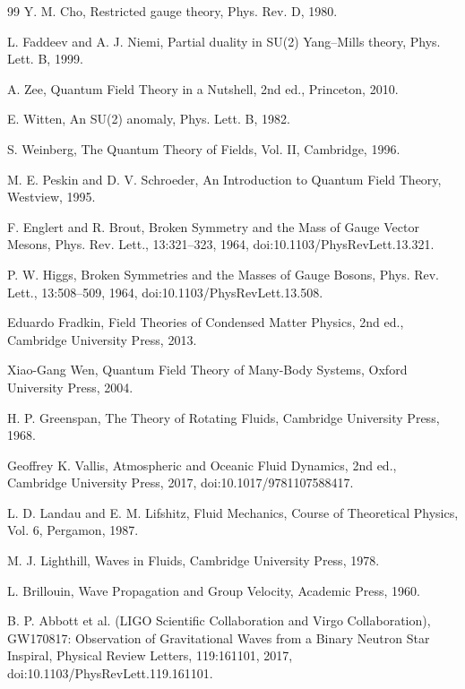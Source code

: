 \documentclass[10pt,reprint,aps,onecolumn,nofootinbib]{revtex4-2}
\begin{document}
\begin{thebibliography}{99}
     Y. M. Cho, Restricted gauge theory, Phys. Rev. D, 1980.

     L. Faddeev and A. J. Niemi, Partial duality in SU(2) Yang–Mills theory, Phys. Lett. B, 1999.

     A. Zee, Quantum Field Theory in a Nutshell, 2nd ed., Princeton, 2010.

     E. Witten, An SU(2) anomaly, Phys. Lett. B, 1982.

     S. Weinberg, The Quantum Theory of Fields, Vol. II, Cambridge, 1996.

     M. E. Peskin and D. V. Schroeder, An Introduction to Quantum Field Theory, Westview, 1995.

     F. Englert and R. Brout, Broken Symmetry and the Mass of Gauge Vector Mesons, Phys. Rev. Lett., 13:321--323, 1964, doi:10.1103/PhysRevLett.13.321.

     P. W. Higgs, Broken Symmetries and the Masses of Gauge Bosons, Phys. Rev. Lett., 13:508--509, 1964, doi:10.1103/PhysRevLett.13.508.

     Eduardo Fradkin, Field Theories of Condensed Matter Physics, 2nd ed., Cambridge University Press, 2013.

     Xiao-Gang Wen, Quantum Field Theory of Many-Body Systems, Oxford University Press, 2004.

     H. P. Greenspan, The Theory of Rotating Fluids, Cambridge University Press, 1968.

     Geoffrey K. Vallis, Atmospheric and Oceanic Fluid Dynamics, 2nd ed., Cambridge University Press, 2017, doi:10.1017/9781107588417.

     L. D. Landau and E. M. Lifshitz, Fluid Mechanics, Course of Theoretical Physics, Vol. 6, Pergamon, 1987.

     M. J. Lighthill, Waves in Fluids, Cambridge University Press, 1978.

     L. Brillouin, Wave Propagation and Group Velocity, Academic Press, 1960.

     B. P. Abbott et al. (LIGO Scientific Collaboration and Virgo Collaboration), GW170817: Observation of Gravitational Waves from a Binary Neutron Star Inspiral, Physical Review Letters, 119:161101, 2017, doi:10.1103/PhysRevLett.119.161101.


\end{thebibliography}
\end{document}
